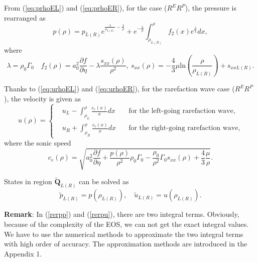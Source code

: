 \documentclass{article}
\numberwithin{equation}{section}
\numberwithin{table}{section}
\begin{document}
From (\ref{eq:prhoEL}) and (\ref{eq:prhoER}), for the case ($R^{E}R^{P}$), the pressure is rearranged as
\begin{equation}\label{rerpp}
  p(\rho)=
	  p_{L(R)}e^{\frac{\lambda}{\rho_{L(R)}}-\frac{\lambda}{\rho}} +e^{-\frac{\lambda}{\rho}}\int_{\rho_{L(R)}}^{\rho} f_2(x) e^{\frac{\lambda}{x}}dx, %
\end{equation}
where
\begin{equation}
  \lambda = \rho_0 \Gamma_0 \quad f_2(\rho) = a_0^2\frac{\partial f}{\partial \eta}- \lambda\frac{s_{xx}(\rho)}{\rho^2}, \ s_{xx}(\rho) =	 -\frac{4}{3}\mu\text{ln}\left(\frac{\rho}{\rho_{L(R)}}\right)+s_{xxL(R)}.
\end{equation}


Thanks to (\ref{eq:urhoEL}) and (\ref{eq:urhoER}), for the rarefaction wave case ($R^{E}R^{P}$), the velocity is given as
\begin{equation} \label{rerpu}
  u(\rho) =\left\{ \begin{aligned}
	&u_L - \int_{\rho_L}^{\rho} \frac{c_e(x)}{x} dx \quad  & \text{for the  left-going rarefaction wave}
 , \\
 &u_R + \int_{\rho_R}^{\rho} \frac{c_e(x)}{x} dx \quad &  \text{for the right-going rarefaction wave} ,
	\end{aligned}
  \right. %
\end{equation}
where the sonic speed
\begin{equation}
  c_e(\rho) =
	  \sqrt{a_0^2 \frac{\partial f}{\partial \eta} + \frac{p(\rho)}{\rho^2}\rho_0\Gamma_0 -\frac{\rho_0}{\rho^2}\Gamma_0 s_{xx}(\rho) +\frac{4}{3}\frac{\mu}{\rho}}. %
\end{equation}

States in region $\tilde{\mathbf{Q}}_{L(R)}$ can be solved as
\begin{equation}
  \tilde{p}_{L(R)} = p(\rho_{L(R)}), \quad \tilde{u}_{L(R)} = u(\rho_{L(R)}).
\end{equation}

\textbf{Remark}:  In (\ref{rerpp}) and (\ref{rerpu}), there are two integral terms. Obviously, because of the complexity of the EOS, we can not get the exact integral values. We have to use the numerical methods to approximate the two integral terms with high order of accuracy. The approximation methods are introduced in the Appendix 1. 
\end{document}
